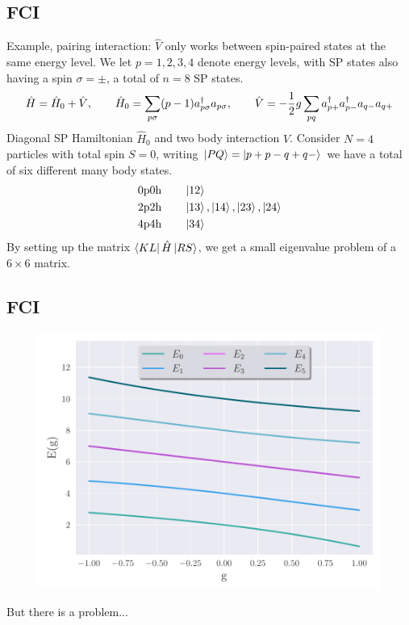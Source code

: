 \documentclass[
11pt,notheorems,hyperref={pdfauthor=whatever}
]{beamer}
\begin{document}
\subsection{FCI}
\begin{frame}
    Example, pairing interaction: $\hat{V}$ only works between spin-paired states at the same energy level. We let $p = 1, 2, 3, 4$ denote energy levels, with SP states also having a spin $\sigma = \pm$, a total of $n = 8$ SP states. 
    \begin{align*}
        \hat{H} = \hat{H}_0 + \hat{V},\hspace{20px} \hat{H}_0 = \sum_{p\sigma} (p-1)\crt{p\sigma}\ani{p\sigma}, \hspace{20px}\hat{V} = -\frac{1}{2}g\sum_{pq}\crt{p+}\crt{p-}\ani{q-}\ani{q+}
    \end{align*}
    Diagonal SP Hamiltonian $\hat{H}_0$ and two body interaction $\hat{V}$. Consider $N = 4$ particles with total spin $S = 0$, writing $\ket{PQ} = \ket{p+p-q+q-}$ we have a total of six different many body states.
    \begin{align*}
        \text{0p0h}&\hspace{20px} \ket{12}  \\
        \text{2p2h}&\hspace{20px} \ket{13}, \ket{14}, \ket{23}, \ket{24} \\  
        \text{4p4h}&\hspace{20px} \ket{34}
    \end{align*}
    By setting up the matrix $\bra{KL}\hat{H}\ket{RS}$, we get a small eigenvalue problem of a $6 \times 6$ matrix.
\end{frame}

\subsection{FCI}
\begin{frame}
    \begin{figure}
        \centering
        \includegraphics[width=0.75\linewidth]{figs/FCI.pdf}
    \end{figure}
    But there is a problem...
\end{frame}
\end{document}
